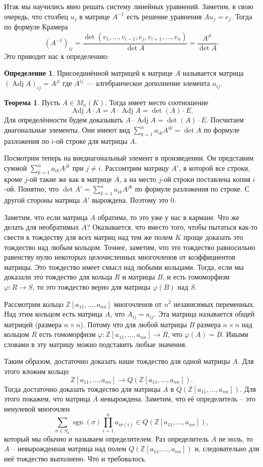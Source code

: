 \documentclass[10pt,a4paper,oneside]{book}
\theoremstyle{definition}
\newtheorem*{defn}{\color{yellow!30!red} Определение}
\newtheorem{thm}{\color{red!40!black}Теорема}
\newcommand{\mb}[1]{\mathbb{#1}}
\newcommand{\Adj}{\operatorname{Adj}}
\newcommand{\sgn}{\operatorname{sgn}}
\def\ffi{\varphi}
\def\thrm{\begin{thm}}
\def\ethrm{\end{thm}}
\def\dfn{\begin{defn}}
\def\edfn{\end{defn}}
\begin{document}
Итак мы научились явно решать систему линейных уравнений. Заметим, в свою очередь, что столбец $u_j$ в матрице $A^{-1}$ есть решение уравнения $Au_j=e_j$. Тогда по формуле Крамера $$(A^{-1})_{ij}=\frac{\det(v_1,\dots,v_{i-1}, e_j,v_{i+1},\dots,v_n)}{\det A}=\frac{A^{ji}}{\det A}.$$
Это приводит нас к определению:

\dfn
Присоединённой матрицей к матрице $A$ называется матрица $(\Adj A)_{ij}= A^{ji}$ где $A^{ij}$ --- алгебраическое дополнение элемента $a_{ij}$.
\edfn

\thrm
Пусть $A\in M_n(K)$. Тогда имеет место соотношение
$$\Adj A \cdot A= A\cdot \Adj A= \det(A)\cdot E.$$
 Для определённости будем доказывать $A\cdot \Adj A= \det(A)\cdot E$. Посчитаем диагональные элементы. Они имеют вид $\sum_{k=1}^n a_{ik} A^{ik}=\det A$ по формуле разложения по $i$-ой строке для матрицы $A$. 

Посмотрим теперь на внедиагональный элемент в произведении. Он представим суммой $\sum_{k=1}^n a_{ik}A^{jk}$ при $j\neq i$. Рассомтрим матрицу $A'$, в которой все строки, кроме $j$-ой такие же как в матрице $A$, а на место $j$-ой строки поставлена копия $i$-ой. Понятно, что $\det A'= \sum_{k=1}^n a_{ik}A^{jk}$ по формуле разложения по строке. С другой стороны матрица $A'$ вырождена. Поэтому это $0$.

 Заметим, что если матрица $A$ обратима, то это уже у нас в кармане. Что же делать для необратимых $A$?
Оказывается, что вместо того, чтобы пытаться как-то свести к тождеству для всех матриц над тем же полем $K$ проще доказать это тождество над любым кольцом. Точнее, заметим, что это тождество равносильно равенству нулю некоторых целочисленных многочленов от коэффициентов матрицы. Это тождество имеет смысл над любыми кольцами. Тогда, если мы доказали это тождество для кольца $R$ и матрицы $B$, и есть гомоморфизм $\ffi \colon R \to S$, то это тождество верно для матрицы $\ffi(B)$ над $S$.

Рассмотрим кольцо $\mb Z[a_{11}, \dots, a_{nn}]$ многочленов от $n^2$ независимых переменных. Над этим кольцом есть матрица $A$, что $A_{ij}=a_{ij}$. Эта матрица называется общей матрицей (размера $n\times n$). Потому что для любой матрицы $B$ размера $n\times n$ над кольцом $R$ есть гомоморфизм $\ffi \colon \mb Z[a_{11},\dots,a_{nn}]\to R $, что $\ffi(A)=B$. Иными словами в эту матрицу можно подставить любые значения.

Таким образом, достаточно доказать наше тождество для одной матрицы $A$. Для этого вложим кольцо
$$\mb Z[a_{11},\dots,a_{nn}] \to Q(\mb Z[a_{11},\dots,a_{nn}]).$$ Тогда достаточно доказать тождество для матрицы $A$ в $Q(\mb Z[a_{11},\dots,a_{nn}])$. Для этого покажем, что матрица $A$ невырождена. Заметим, что её определитель -- это ненулевой многочлен $$\sum_{\sigma \in S_n} \sgn(\sigma) \prod_{i=1}^n a_{i\sigma(i)} \in Q(\mb Z[a_{11},\dots,a_{nn}]),$$ который мы обычно и называем определителем. Раз определитель $A$ не ноль, то $A$ -- невырожденная матрица над полем $Q(\mb Z[a_{11},\dots,a_{nn}])$ и, следовательно для неё тождество выполнено. Что и требовалось.
\endproof
\ethrm
\end{document}
